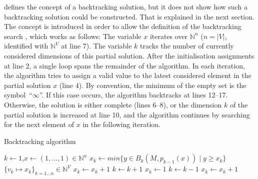      defines the concept of a backtracking solution, but
    it does not show how such a backtracking solution could be constructed.
    That is explained in the next section.
    The concept is introduced in order to allow the definition of the
    backtracking search , which works as follows:
    The variable $x$ iterates over $\mathbb N^n$
    ($n=|V|$, identified with $\mathbb N^V$ at line 7).
    The variable $k$ tracks the number of currently considered dimensions of
    this partial solution.
    After the initialisation assignments at line 2, a single loop spans the
    remainder of the algorithm.
    In each iteration, the algorithm tries to assign a valid value to the latest
    considered element in the partial solution $x$ (line 4).
    By convention, the minimum of the empty set is the
    \mbox{symbol ``$\infty$''}.
    If this case occurs, the algorithm backtracks at lines 12--17.
    Otherwise, the solution is either complete (lines 6--8), or the dimension
    $k$ of the partial solution is increased at line 10, and the
    algorithm continues by searching for the next element of $x$ in the
    following iteration.

\begin{algorithm}[p]
    \caption{Backtracking algorithm}
    \begin{algorithmic}[1]
        \vspace{-0.45em}
            \State $k\gets1$,\quad$x\gets(1,\dots,1)\in\mathbb N^n$\vspace{-0.45em}
            \vspace{-0.45em}
                \State $x_k\gets min\{y\in B_k(M,p_{k-1}(x))\mid y\geq x_k\}$\vspace{-0.45em}
                \vspace{-0.45em}
                    \vspace{-0.45em}
                         $\{v_k\mapsto x_k\}_{k=1\dots n}\in\mathbb N^V$\vspace{-0.45em}
                        \State $x_k\gets x_k+1$\vspace{-0.45em}
                    \Else\vspace{-0.45em}
                        \State $k\gets k+1$\vspace{-0.45em}
                        \State $x_k\gets1$\vspace{-0.45em}
                    \EndIf
                \Else\vspace{-0.45em}
                    \State $k\gets k-1$\vspace{-0.45em}
                    \vspace{-0.45em}
                        \State$x_k\gets x_k+1$\vspace{-0.45em}
                    \Else\vspace{-0.45em}
                    \EndIf
                \EndIf
            \EndWhile
        \EndProcedure
    \end{algorithmic}
    \label{backtrackalg}
\end{algorithm}

